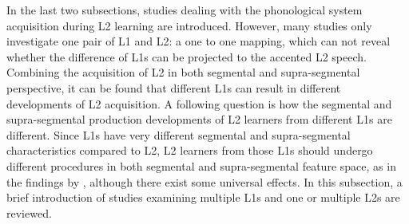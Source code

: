 In the last two subsections, studies dealing with the phonological system acquisition during L2 learning are introduced. However, many studies only investigate one pair of L1 and L2: a one to one mapping, which can not reveal whether the difference of L1s can be projected to the accented L2 speech. Combining the acquisition of L2 in both segmental and supra-segmental perspective, it can be found that different L1s can result in different developments of L2 acquisition. A following question is how the segmental and supra-segmental production developments of L2 learners from different L1s are different. Since L1s have very different segmental and supra-segmental characteristics compared to L2, L2 learners from those L1s should undergo different procedures in both segmental and supra-segmental feature space, as in the findings by \cite{ordin2015acquisition}, although there exist some universal effects. In this subsection, a brief introduction of studies examining multiple L1s and one or multiple L2s are reviewed.
